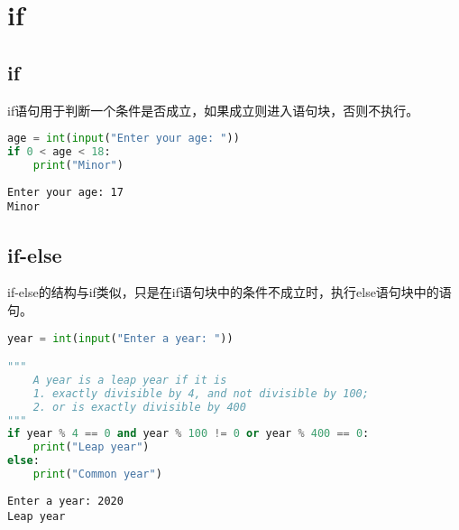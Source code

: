 \newpage

\section{if}

\subsection{if}

if语句用于判断一个条件是否成立，如果成立则进入语句块，否则不执行。\\


\begin{lstlisting}[language=Python]
age = int(input("Enter your age: "))
if 0 < age < 18:
	print("Minor")
\end{lstlisting}

\begin{tcolorbox}
	\begin{verbatim}
Enter your age: 17
Minor
\end{verbatim}
\end{tcolorbox}

\vspace{0.5cm}

\subsection{if-else}

if-else的结构与if类似，只是在if语句块中的条件不成立时，执行else语句块中的语句。\\


\begin{lstlisting}[language=Python]
year = int(input("Enter a year: "))

"""
	A year is a leap year if it is
	1. exactly divisible by 4, and not divisible by 100;
	2. or is exactly divisible by 400
"""
if year % 4 == 0 and year % 100 != 0 or year % 400 == 0:
	print("Leap year")
else:
	print("Common year")
\end{lstlisting}

\begin{tcolorbox}
	\begin{verbatim}
Enter a year: 2020
Leap year
\end{verbatim}
\end{tcolorbox}

\vspace{0.5cm}

